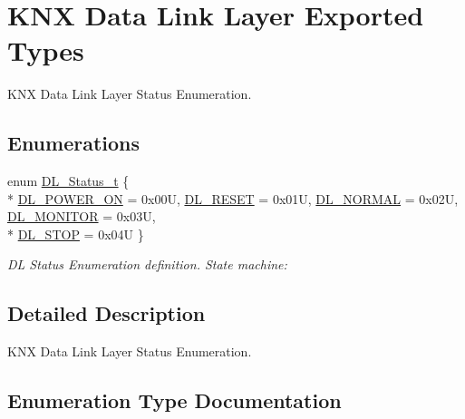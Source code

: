 \hypertarget{group___k_n_x___d_l___exported___types}{}\section{K\+NX Data Link Layer Exported Types}
\label{group___k_n_x___d_l___exported___types}


K\+NX Data Link Layer Status Enumeration.  


\subsection*{Enumerations}
\begin{DoxyCompactItemize}
\item 
enum \hyperlink{group___k_n_x___d_l___exported___types_ga143539be3680d9b7f990a9dfe1df40fe}{D\+L\+\_\+\+Status\+\_\+t} \{ \\*
\hyperlink{group___k_n_x___d_l___exported___types_gga143539be3680d9b7f990a9dfe1df40fea8be7f520654ac8f7854b3caf3b0a5019}{D\+L\+\_\+\+P\+O\+W\+E\+R\+\_\+\+ON} = 0x00U, 
\hyperlink{group___k_n_x___d_l___exported___types_gga143539be3680d9b7f990a9dfe1df40fea80e6219a436df0a34c8533186c5e44c2}{D\+L\+\_\+\+R\+E\+S\+ET} = 0x01U, 
\hyperlink{group___k_n_x___d_l___exported___types_gga143539be3680d9b7f990a9dfe1df40fea461c81727c49b6e32e3caf88887d53bd}{D\+L\+\_\+\+N\+O\+R\+M\+AL} = 0x02U, 
\hyperlink{group___k_n_x___d_l___exported___types_gga143539be3680d9b7f990a9dfe1df40feab460a3cda55e265ecedd269d942e1ef0}{D\+L\+\_\+\+M\+O\+N\+I\+T\+OR} = 0x03U, 
\\*
\hyperlink{group___k_n_x___d_l___exported___types_gga143539be3680d9b7f990a9dfe1df40fea46083fdde5108543c09e29c2c2659cb6}{D\+L\+\_\+\+S\+T\+OP} = 0x04U
 \}\begin{DoxyCompactList}\small\item\em DL Status Enumeration definition. State machine\+: \end{DoxyCompactList}
\end{DoxyCompactItemize}


\subsection{Detailed Description}
K\+NX Data Link Layer Status Enumeration. 



\subsection{Enumeration Type Documentation}
